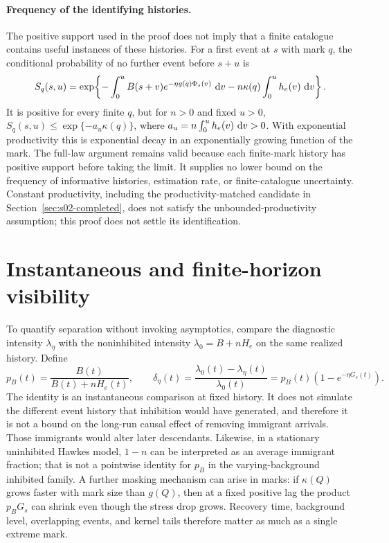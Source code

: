 \paragraph{Frequency of the identifying histories.}
The positive support used in the proof does not imply that a finite catalogue contains useful instances of these histories. For a first event at \(s\) with mark \(q\), the conditional probability of no further event before \(s+u\) is
\[
S_q(s,u)=
\exp\!\left\{-\int_0^u B(s+v)e^{-\eta g(q)\Phi_s(v)}\,\mathop{}\!\mathrm{d} v
             -n\kappa(q)\int_0^u h_e(v)\,\mathop{}\!\mathrm{d} v\right\}.
\]
It is positive for every finite \(q\), but for \(n>0\) and fixed \(u>0\),
\(S_q(s,u)\leq \exp\{-a_u\kappa(q)\}\), where
\(a_u=n\int_0^u h_e(v)\,\mathop{}\!\mathrm{d} v>0\).
With exponential productivity this is exponential decay in an exponentially growing function of the mark. The full-law argument remains valid because each finite-mark history has positive support before taking the limit. It supplies no lower bound on the frequency of informative histories, estimation rate, or finite-catalogue uncertainty. Constant productivity, including the productivity-matched candidate in Section~\ref{sec:s02-completed}, does not satisfy the unbounded-productivity assumption; this proof does not settle its identification.

\section{Instantaneous and finite-horizon visibility}

To quantify separation without invoking asymptotics, compare the diagnostic intensity \(\lambda_\eta\) with the noninhibited intensity \(\lambda_0=B+nH_e\) on the same realized history. Define
\[
p_B(t)=\frac{B(t)}{B(t)+nH_e(t)},
\qquad
\delta_\eta(t)=\frac{\lambda_0(t)-\lambda_\eta(t)}{\lambda_0(t)}
=p_B(t)\left(1-e^{-\eta G_s(t)}\right).
\]
The identity is an instantaneous comparison at fixed history. It does not simulate the different event history that inhibition would have generated, and therefore it is not a bound on the long-run causal effect of removing immigrant arrivals. Those immigrants would alter later descendants. Likewise, in a stationary uninhibited Hawkes model, \(1-n\) can be interpreted as an average immigrant fraction; that is not a pointwise identity for \(p_B\) in the varying-background inhibited family. A further masking mechanism can arise in marks: if \(\kappa(Q)\) grows faster with mark size than \(g(Q)\), then at a fixed positive lag the product \(p_BG_s\) can shrink even though the stress drop grows. Recovery time, background level, overlapping events, and kernel tails therefore matter as much as a single extreme mark.

